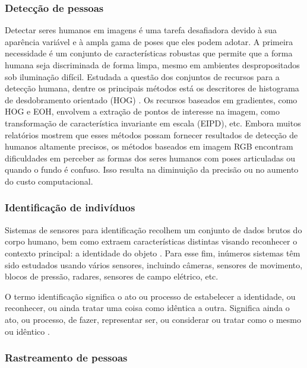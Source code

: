 \subsubsection{Detecção de pessoas}\label{sec:deteccao-movimento}
Detectar seres humanos em imagens é uma tarefa desafiadora devido à sua aparência variável e à ampla gama de poses que eles podem adotar. A primeira necessidade é um conjunto de características robustas que permite que a forma humana seja discriminada de forma limpa, mesmo em ambientes despropositados sob iluminação difícil. Estudada a questão dos conjuntos de recursos para a detecção humana, dentre os principais métodos está  os descritores de histograma de desdobramento orientado (HOG) \cite{dalal2005histograms}. Os recursos baseados em gradientes, como HOG e EOH, envolvem a extração de pontos de interesse na imagem, como transformação de característica invariante em escala (EIPD), etc. Embora muitos relatórios mostrem que esses métodos possam fornecer resultados de detecção de humanos altamente precisos, os métodos baseados em imagem RGB encontram dificuldades em perceber as formas dos seres humanos com poses articuladas ou quando o fundo é confuso. Isso resulta na diminuição da precisão ou no aumento do custo computacional\cite{dalal2005histograms}.

\subsubsection{Identificação de indivíduos}\label{sec:identificacao-pessoas}

Sistemas de sensores para identificação recolhem um conjunto de dados brutos do corpo humano, bem como extraem características distintas visando reconhecer o contexto principal: a identidade do objeto \cite{yun2014human}. Para esse fim, inúmeros sistemas têm sido estudados usando vários sensores, incluindo câmeras, sensores de movimento, blocos de pressão, radares, sensores de campo elétrico, etc.

O termo identificação significa o ato ou processo de estabelecer a identidade, ou reconhecer, ou ainda tratar uma coisa como idêntica a outra. Significa ainda o ato, ou processo, de fazer, representar ser, ou considerar ou tratar como o mesmo ou idêntico\cite{yun2014human} .

\subsubsection{Rastreamento de pessoas}\label{sec:rastre-amb-fec}

